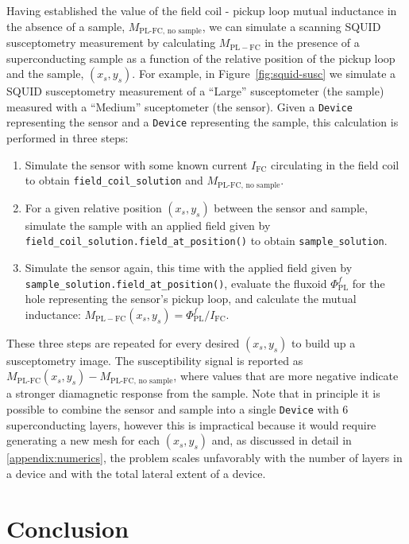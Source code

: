 \documentclass[final,3p,times,twocolumn]{elsarticle}
\newcommand{\inline}[1]{\texttt{#1}\xspace}
\begin{document}
Having established the value of the field coil - pickup loop mutual inductance in the absence of a sample, $M_\text{PL-FC, no sample}$, we can simulate a scanning SQUID susceptometry measurement by calculating $M_\mathrm{PL-FC}$ in the presence of a superconducting sample as a function of the relative position of the pickup loop and the sample, $(x_s, y_s)$. For example, in Figure~\ref{fig:squid-susc} we simulate a SQUID susceptometry measurement of a ``Large'' susceptometer (the sample) measured with a ``Medium'' suceptometer (the sensor). Given a \inline{Device} representing the sensor and a \inline{Device} representing the sample, this calculation is performed in three steps:
\begin{enumerate}
    \item{Simulate the sensor with some known current $I_\mathrm{FC}$ circulating in the field coil to obtain \inline{field_coil_solution} and $M_\text{PL-FC, no sample}$.}
    \item{For a given relative position $(x_s, y_s)$ between the sensor and sample, simulate the sample with an applied field given by \inline{field_coil_solution.field_at_position()} to obtain \inline{sample_solution}.}
    \item{Simulate the sensor again, this time with the applied field given by \inline{sample_solution.field_at_position()}, evaluate the fluxoid $\Phi^f_\mathrm{PL}$ for the hole representing the sensor's pickup loop, and calculate the mutual inductance: $M_\mathrm{PL-FC}(x_s, y_s)=\Phi^f_\mathrm{PL} / I_\mathrm{FC}$.}
\end{enumerate}
These three steps are repeated for every desired $(x_s, y_s)$ to build up a susceptometry image. The susceptibility signal is reported as $M_\text{PL-FC}(x_s, y_s) - M_\text{PL-FC, no sample}$, where values that are more negative indicate a stronger diamagnetic response from the sample. Note that in principle it is possible to combine the sensor and sample into a single \inline{Device} with 6 superconducting layers, however this is impractical because it would require generating a new mesh for each $(x_s, y_s)$ and, as discussed in detail in \ref{appendix:numerics}, the problem scales unfavorably with the number of layers in a device and with the total lateral extent of a device.

\section{Conclusion}
\label{section:conlusion}
\end{document}
